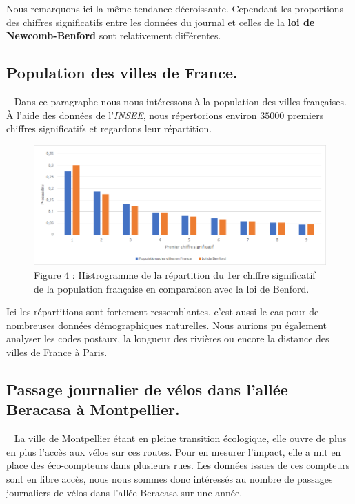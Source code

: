 \documentclass[
  12pt,
]{article}
\begin{document}
Nous remarquons ici la même tendance décroissante. Cependant les
proportions des chiffres significatifs entre les données du journal et
celles de la \textbf{loi de Newcomb-Benford} sont relativement
différentes.

\hypertarget{population-des-villes-de-france.}{%
\subsection{Population des villes de
France.}\label{population-des-villes-de-france.}}

~ Dans ce paragraphe nous nous intéressons à la population des villes
françaises. À l'aide des données de l'\emph{INSEE}, nous répertorions
environ \(35000\) premiers chiffres significatifs et regardons leur
répartition.

\begin{figure}
\centering
\includegraphics{Images/histogramme_populationfrancaise.png}
\caption{Figure 4 : Histrogramme de la répartition du 1er chiffre
significatif de la population française en comparaison avec la loi de
Benford.}
\end{figure}

Ici les répartitions sont fortement ressemblantes, c'est aussi le cas
pour de nombreuses données démographiques naturelles. Nous aurions pu
également analyser les codes postaux, la longueur des rivières ou encore
la distance des villes de France à Paris.

\newpage

\hypertarget{passage-journalier-de-vuxe9los-dans-lalluxe9e-beracasa-uxe0-montpellier.}{%
\subsection{Passage journalier de vélos dans l'allée Beracasa à
Montpellier.}\label{passage-journalier-de-vuxe9los-dans-lalluxe9e-beracasa-uxe0-montpellier.}}

~ La ville de Montpellier étant en pleine transition écologique, elle
ouvre de plus en plus l'accès aux vélos sur ces routes. Pour en mesurer
l'impact, elle a mit en place des éco-compteurs dans plusieurs rues. Les
données issues de ces compteurs sont en libre accès, nous nous sommes
donc intéressés au nombre de passages journaliers de vélos dans l'allée
Beracasa sur une année.
\end{document}
